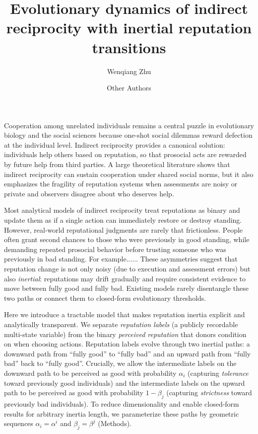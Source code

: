 \documentclass[fleqn,10pt]{wlscirep}
\title{Evolutionary dynamics of indirect reciprocity with inertial reputation transitions}
\author[1,2]{Wenqiang Zhu}
\author[1,2*]{Other Authors}
\affil[1]{School of Artificial Intelligence, Beihang University, Beijing, 100191, China}
\affil[2]{Key laboratory of Mathematics, Informatics and Behavioral Semantics, Beihang University, Beijing 100191, China}
\affil[*]{Corresponding to: 11~(1.~1); 22 (2.~2)}
\begin{document}
\flushbottom
\maketitle



\maketitle

\section*{}

Cooperation among unrelated individuals remains a central puzzle in evolutionary biology and the social sciences because one-shot social dilemmas reward defection at the individual level. Indirect reciprocity provides a canonical solution: individuals help others based on reputation, so that prosocial acts are rewarded by future help from third parties. A large theoretical literature shows that indirect reciprocity can sustain cooperation under shared social norms, but it also emphasizes the fragility of reputation systems when assessments are noisy or private and observers disagree about who deserves help.

Most analytical models of indirect reciprocity treat reputations as binary and update them as if a single action can immediately restore or destroy standing. However, real-world reputational judgments are rarely that frictionless. People often grant second chances to those who were previously in good standing, while demanding repeated prosocial behavior before trusting someone who was previously in bad standing. For example...... These asymmetries suggest that reputation change is not only noisy (due to execution and assessment errors) but also \emph{inertial}: reputations may drift gradually and require consistent evidence to move between fully good and fully bad. Existing models rarely disentangle these two paths or connect them to closed-form evolutionary thresholds.



Here we introduce a tractable model that makes reputation inertia explicit and analytically transparent. We separate \emph{reputation labels} (a publicly recordable multi-state variable) from the binary \emph{perceived reputation} that donors condition on when choosing actions.
Reputation labels evolve through two inertial paths: a downward path from ``fully good'' to ``fully bad'' and an upward path from ``fully bad'' back to ``fully good''. Crucially, we allow the intermediate labels on the downward path to be perceived as good with probability $\alpha_i$ (capturing \emph{tolerance} toward previously good individuals) and the intermediate labels on the upward path to be perceived as good with probability $1-\beta_j$ (capturing \emph{strictness} toward previously bad individuals). To reduce dimensionality and enable closed-form results for arbitrary inertia length, we parameterize these paths by geometric sequences $\alpha_i=\alpha^i$ and $\beta_j=\beta^j$ (Methods).
\end{document}
